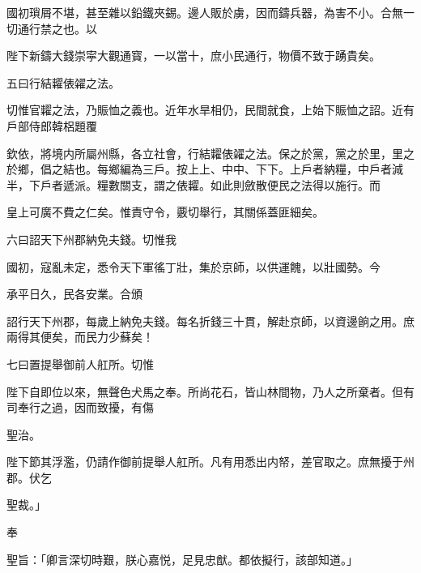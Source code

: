 \begin{myquote}[\markfont]
國初瑣屑不堪，甚至雜以鉛鐵夾錫。邊人販於虜，因而鑄兵器，為害不小。合無一切通行禁之也。以

陛下新鑄大錢崇寜大觀通寳，一以當十，庶小民通行，物價不致于踴貴矣。

\hspace*{2em}五曰行結糶俵糴之法。

切惟官糶之法，乃賑恤之義也。近年水旱相仍，民間就食，上始下賑恤之詔。近有戶部侍郎韓梠題覆

欽依，將境内所屬州縣，各立社會，行結糶俵糴之法。保之於黨，黨之於里，里之於鄉，倡之結也。每鄉編為三戶。按上上、中中、下下。上戶者納糧，中戶者減半，下戶者遞派。糧數關支，謂之俵糶。如此則斂散便民之法得以施行。而

皇上可廣不費之仁矣。惟責守令，覈切舉行，其關係蓋匪細矣。

\hspace*{2em}六曰詔天下州郡納免夫錢。切惟我

國初，寇亂未定，悉令天下軍徭丁壯，集於京師，以供運餽，以壯國勢。今

承平日久，民各安業。合頒

詔行天下州郡，每歲上納免夫錢。每名折錢三十貫，解赴京師，以資邊餉之用。庶兩得其便矣，而民力少蘇矣！

\hspace*{2em}七曰置提舉御前人舡所。切惟

陛下自即位以來，無聲色犬馬之奉。所尚花石，皆山林間物，乃人之所棄者。但有司奉行之過，因而致擾，有傷

聖治。

陛下節其浮濫，仍請作御前提舉人舡所。凡有用悉出内帑，差官取之。庶無擾于州郡。伏乞

聖裁。」

奉

聖旨：「卿言深切時艱，朕心嘉悦，足見忠猷。都依擬行，該部知道。」
\end{myquote}

